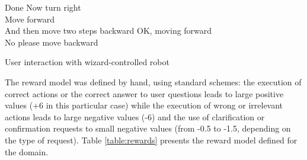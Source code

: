 \begin{Transcript}[p]
\begin{dialogue}
 Done\vspace{2mm}
 Now turn right \vspace{1mm} \\ 
 \vspace{2mm}
 Move forward \vspace{1mm} \\ 
 \vspace{2mm}
 And then move two steps backward\vspace{2mm}
 OK, moving forward\vspace{1mm} \\
 \vspace{2mm}
 No please move backward \vspace{1mm} \\ 
 \vspace{2mm}
\end{dialogue}
\vspace{-4mm} \hspace{1cm} \vspace{3mm}
\caption{User interaction with wizard-controlled robot}
\end{Transcript}

The reward model was defined by hand, using standard schemes: the execution of correct actions or the correct answer to user questions leads to large positive values (+6 in this particular case) while the execution of wrong or irrelevant actions leads to large negative values (-6) and the use of clarification or confirmation requests to small negative values (from -0.5 to -1.5, depending on the type of request). Table \ref{table:rewards} presents the reward model defined for the domain. 


